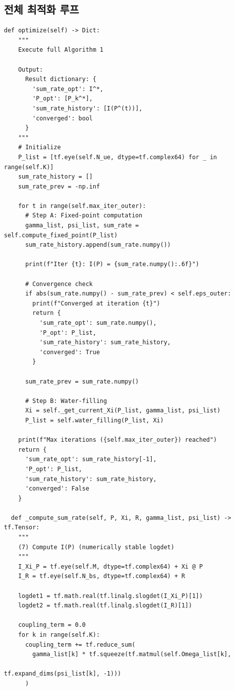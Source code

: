 \documentclass[10pt]{article}
\begin{document}
\subsection{전체 최적화 루프}

\begin{lstlisting}[caption={Main Optimization Loop}]
  def optimize(self) -> Dict:
    """
    Execute full Algorithm 1
    
    Output:
      Result dictionary: {
        'sum_rate_opt': I^*,
        'P_opt': [P_k^*],
        'sum_rate_history': [I(P^(t))],
        'converged': bool
      }
    """
    # Initialize
    P_list = [tf.eye(self.N_ue, dtype=tf.complex64) for _ in range(self.K)]
    sum_rate_history = []
    sum_rate_prev = -np.inf
    
    for t in range(self.max_iter_outer):
      # Step A: Fixed-point computation
      gamma_list, psi_list, sum_rate = self.compute_fixed_point(P_list)
      sum_rate_history.append(sum_rate.numpy())
      
      print(f"Iter {t}: I(P) = {sum_rate.numpy():.6f}")
      
      # Convergence check
      if abs(sum_rate.numpy() - sum_rate_prev) < self.eps_outer:
        print(f"Converged at iteration {t}")
        return {
          'sum_rate_opt': sum_rate.numpy(),
          'P_opt': P_list,
          'sum_rate_history': sum_rate_history,
          'converged': True
        }
      
      sum_rate_prev = sum_rate.numpy()
      
      # Step B: Water-filling
      Xi = self._get_current_Xi(P_list, gamma_list, psi_list)
      P_list = self.water_filling(P_list, Xi)
    
    print(f"Max iterations ({self.max_iter_outer}) reached")
    return {
      'sum_rate_opt': sum_rate_history[-1],
      'P_opt': P_list,
      'sum_rate_history': sum_rate_history,
      'converged': False
    }
  
  def _compute_sum_rate(self, P, Xi, R, gamma_list, psi_list) -> tf.Tensor:
    """
    (7) Compute I(P) (numerically stable logdet)
    """
    I_Xi_P = tf.eye(self.M, dtype=tf.complex64) + Xi @ P
    I_R = tf.eye(self.N_bs, dtype=tf.complex64) + R
    
    logdet1 = tf.math.real(tf.linalg.slogdet(I_Xi_P)[1])
    logdet2 = tf.math.real(tf.linalg.slogdet(I_R)[1])
    
    coupling_term = 0.0
    for k in range(self.K):
      coupling_term += tf.reduce_sum(
        gamma_list[k] * tf.squeeze(tf.matmul(self.Omega_list[k], 
                                              tf.expand_dims(psi_list[k], -1)))
      )
    

\end{lstlisting}
\end{document}
